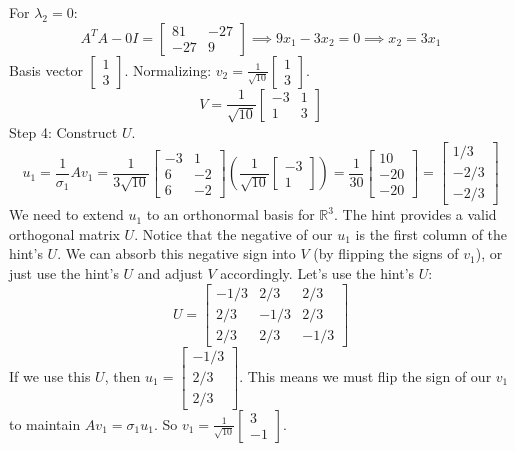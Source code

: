 \documentclass[11pt, letterpaper]{article}
\theoremstyle{definition}
\theoremstyle{remark}
\newcommand{\R}{\mathbb{R}}
\begin{document}
For $\lambda_2 = 0$:
\[
A^TA - 0I = \begin{bmatrix} 81 & -27 \\ -27 & 9 \end{bmatrix} \implies 9x_1 - 3x_2 = 0 \implies x_2 = 3x_1
\]
Basis vector $\begin{bmatrix} 1 \\ 3 \end{bmatrix}$. Normalizing: $v_2 = \frac{1}{\sqrt{10}}\begin{bmatrix} 1 \\ 3 \end{bmatrix}$.
\[
V = \frac{1}{\sqrt{10}} \begin{bmatrix} -3 & 1 \\ 1 & 3 \end{bmatrix}
\]
Step 4: Construct $U$.
\[
u_1 = \frac{1}{\sigma_1} A v_1 = \frac{1}{3\sqrt{10}} \begin{bmatrix} -3 & 1 \\ 6 & -2 \\ 6 & -2 \end{bmatrix} \left( \frac{1}{\sqrt{10}} \begin{bmatrix} -3 \\ 1 \end{bmatrix} \right) = \frac{1}{30} \begin{bmatrix} 10 \\ -20 \\ -20 \end{bmatrix} = \begin{bmatrix} 1/3 \\ -2/3 \\ -2/3 \end{bmatrix}
\]
We need to extend $u_1$ to an orthonormal basis for $\R^3$. The hint provides a valid orthogonal matrix $U$. Notice that the negative of our $u_1$ is the first column of the hint's $U$. We can absorb this negative sign into $V$ (by flipping the signs of $v_1$), or just use the hint's $U$ and adjust $V$ accordingly. Let's use the hint's $U$:
\[
U = \begin{bmatrix} -1/3 & 2/3 & 2/3 \\ 2/3 & -1/3 & 2/3 \\ 2/3 & 2/3 & -1/3 \end{bmatrix}
\]
If we use this $U$, then $u_1 = \begin{bmatrix} -1/3 \\ 2/3 \\ 2/3 \end{bmatrix}$. This means we must flip the sign of our $v_1$ to maintain $Av_1 = \sigma_1 u_1$. So $v_1 = \frac{1}{\sqrt{10}}\begin{bmatrix} 3 \\ -1 \end{bmatrix}$.
\end{document}
